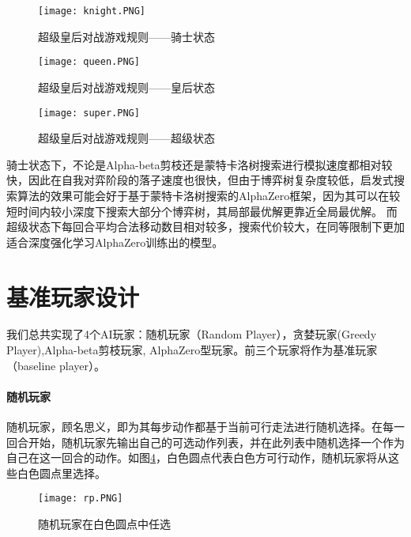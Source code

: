 \begin{figure}[H]
    \centering
    \texttt{[image: knight.PNG]}
    \caption[rules-knight]{%
        超级皇后对战游戏规则——骑士状态%
      }
    \label{fig:knight}
\end{figure}

\begin{figure}[H]
    \centering
    \texttt{[image: queen.PNG]}
    \caption[rules-queen]{%
        超级皇后对战游戏规则——皇后状态%
      }
    \label{fig:queen}
\end{figure}

\begin{figure}[H]
    \centering
    \texttt{[image: super.PNG]}
    \caption[rules-super]{%
        超级皇后对战游戏规则——超级状态%
      }
    \label{fig:super}
\end{figure}
骑士状态下，不论是Alpha-beta剪枝还是蒙特卡洛树搜索进行模拟速度都相对较快，因此在自我对弈阶段的落子速度也很快，但由于博弈树复杂度较低，启发式搜索算法的效果可能会好于基于蒙特卡洛树搜索的AlphaZero框架，因为其可以在较短时间内较小深度下搜索大部分个博弈树，其局部最优解更靠近全局最优解。
而超级状态下每回合平均合法移动数目相对较多，搜索代价较大，在同等限制下更加适合深度强化学习AlphaZero训练出的模型。

\section{基准玩家设计}
我们总共实现了4个AI玩家：随机玩家（Random Player），贪婪玩家(Greedy Player),Alpha-beta剪枝玩家, AlphaZero型玩家。前三个玩家将作为基准玩家（baseline player）。
\paragraph{随机玩家}
随机玩家，顾名思义，即为其每步动作都基于当前可行走法进行随机选择。在每一回合开始，随机玩家先输出自己的可选动作列表，并在此列表中随机选择一个作为自己在这一回合的动作。如图\ref{fig:super}，白色圆点代表白色方可行动作，随机玩家将从这些白色圆点里选择。
\begin{figure}[H]
    \centering
    \texttt{[image: rp.PNG]}
    \caption[rp]{%
        随机玩家在白色圆点中任选%
      }
    \label{fig:super}
\end{figure}
